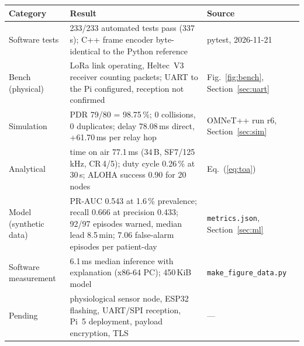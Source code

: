 \documentclass[10pt,a4paper]{article}
\begin{document}
\vspace{6pt}
\label{tab:glance}
\vspace{-2pt}
{\small
\begin{tabularx}{\textwidth}{@{}L{2.6cm}YL{3.3cm}@{}}
\toprule
Category & Result & Source\\
\midrule
Software tests & 233/233 automated tests pass (337\,s); C++ frame encoder byte-identical to the Python reference & pytest, 2026-11-21\\
Bench (physical) & LoRa link operating, Heltec~V3 receiver counting packets; UART to the Pi configured, reception not confirmed & Fig.~\ref{fig:bench}, Section~\ref{sec:uart}\\
Simulation & PDR 79/80 = 98.75\,\%; 0 collisions, 0 duplicates; delay 78.08\,ms direct, +61.70\,ms per relay hop & OMNeT++ run r6, Section~\ref{sec:sim}\\
Analytical & time on air 77.1\,ms (34\,B, SF7/125\,kHz, CR\,4/5); duty cycle 0.26\,\% at 30\,s; ALOHA success 0.90 for 20 nodes & Eq.~(\ref{eq:toa})\\
Model (synthetic data) & PR-AUC 0.543 at 1.6\,\% prevalence; recall 0.666 at precision 0.433; 92/97 episodes warned, median lead 8.5\,min; 7.06 false-alarm episodes per patient-day & \texttt{metrics.json}, Section~\ref{sec:ml}\\
Software measurement & 6.1\,ms median inference with explanation (x86-64 PC); 450\,KiB model & \texttt{make\_figure\_data.py}\\
Pending & physiological sensor node, ESP32 flashing, UART/SPI reception, Pi~5 deployment, payload encryption, TLS & ---\\
\bottomrule
\end{tabularx}}

\end{document}
